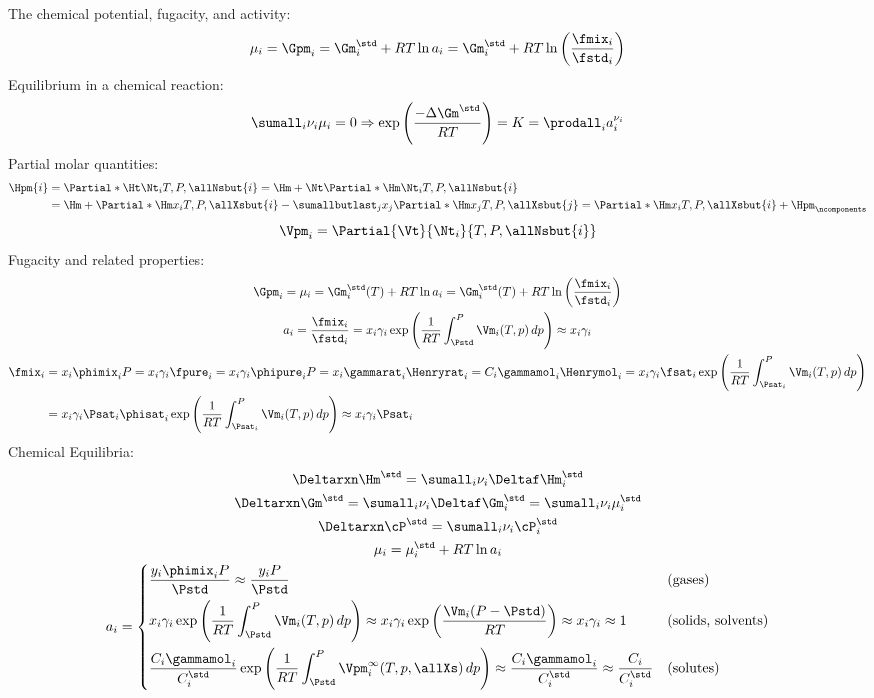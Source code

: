 \documentclass{article}
\begin{document}
The chemical potential, fugacity, and activity:
\[ \mu_i = \Gpm_i = \Gm_i^\std + RT \ln a_i
         = \Gm_i^\std + RT\ln\left(\frac{\fmix_i}{\fstd_i}\right) \]
Equilibrium in a chemical reaction:
\[ \sumall_i \nu_i \mu_i = 0
    \Rightarrow
    \exp\left(\frac{-\Delta\Gm^\std}{RT}\right) = K = \prodall_i a_i^{\nu_i} \]
Partial molar quantities:
\begin{align*}
  \Hpm{i} &= \Partial*{\Ht}{\Nt_i}{T,P,\allNsbut{i}}
           = \Hm + \Nt \Partial*{\Hm}{\Nt_i}{T,P,\allNsbut{i}}
       \\ &= \Hm + \Partial*{\Hm}{x_i}{T,P,\allXsbut{i}}
                 - \sumallbutlast_j x_j \Partial*{\Hm}{x_j}{T,P,\allXsbut{j}}
           = \Partial*{\Hm}{x_i}{T,P,\allXsbut{i}} + \Hpm_\ncomponents
\end{align*}
\[ \Vpm_i = \Partial{\Vt}{\Nt_i}{T,P,\allNsbut{i}} \]
Fugacity and related properties:
\begin{gather*}
  \Gpm_i = \mu_i
         = \Gm_i^\std(T) + RT\ln a_i
         = \Gm_i^\std(T) + RT\ln\left(\frac{\fmix_i}{\fstd_i}\right)
  \\
  a_i = \frac{\fmix_i}{\fstd_i}
      = x_i \gamma_i
                \exp\left(\frac{1}{RT} \int_{\Pstd}^P \Vm_i(T,p)\,dp\right)
      \approx x_i \gamma_i
  \\
  \begin{split}
  \fmix_i &= x_i \phimix_i P
           = x_i \gamma_i \fpure_i = x_i \gamma_i \phipure_i P
           = x_i \gammarat_i \Henryrat_i
           = C_i \gammamol_i \Henrymol_i
           = x_i \gamma_i \fsat_i
                 \exp\left(\frac{1}{RT} \int_{\Psat_i}^P \Vm_i(T,p)\,dp\right)
       \\ &= x_i \gamma_i \Psat_i \phisat_i
                \exp\left(\frac{1}{RT} \int_{\Psat_i}^P \Vm_i(T,p)\,dp\right)
          \approx x_i \gamma_i \Psat_i
  \end{split}
\end{gather*}
Chemical Equilibria:
\begin{gather*}
  \Deltarxn\Hm^\std = \sumall_i \nu_i \Deltaf\Hm_i^\std \\
  \Deltarxn\Gm^\std = \sumall_i \nu_i \Deltaf\Gm_i^\std
                    = \sumall_i \nu_i \mu_i^\std \\
  \Deltarxn\cP^\std = \sumall_i \nu_i \cP_i^\std \\
  \mu_i = \mu_i^\std + RT\ln a_i \\
  a_i = \begin{cases}
\displaystyle
     \frac{y_i \phimix_i P}{\Pstd} \approx \frac{y_i P}{\Pstd}
        & \text{(gases)} \\
\rule{0pt}{5ex}%
\displaystyle
     x_i \gamma_i \exp\left(\frac{1}{RT} \int_{\Pstd}^P \Vm_i(T,p)\,dp\right)
     \approx
     x_i \gamma_i \exp\left(\frac{\Vm_i(P-\Pstd)}{RT}\right)
     \approx x_i \gamma_i \approx 1
        & \text{(solids, solvents)} \\
\displaystyle
\rule{0pt}{5ex}%
     \frac{C_i \gammamol_i}{C_i^\std}
        \exp\left(\frac{1}{RT}
        \int_{\Pstd}^P \Vpm_i^\infty(T,p,\allXs)\,dp\right)
     \approx
     \frac{C_i \gammamol_i}{C_i^\std} \approx \frac{C_i}{C_i^\std}
        & \text{(solutes)}
        \end{cases}
\end{gather*}
\end{document}
